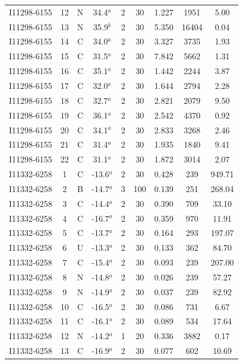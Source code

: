 \begin{table}
\begin{tabular}{ccccccccc}
I11298-6155 & 12 & N & 34.4$^{a}$ & 2 & 30 & 1.227 & 1951 & 5.00 \\
I11298-6155 & 13 & N & 35.9$^{b}$ & 2 & 30 & 5.350 & 16404 & 0.04 \\
I11298-6155 & 14 & C & 34.0$^{a}$ & 2 & 30 & 3.327 & 3735 & 1.93 \\
I11298-6155 & 15 & C & 31.5$^{a}$ & 2 & 30 & 7.842 & 5662 & 1.31 \\
I11298-6155 & 16 & C & 35.1$^{a}$ & 2 & 30 & 1.442 & 2244 & 3.87 \\
I11298-6155 & 17 & C & 32.0$^{a}$ & 2 & 30 & 1.644 & 2794 & 2.28 \\
I11298-6155 & 18 & C & 32.7$^{a}$ & 2 & 30 & 2.821 & 2079 & 9.50 \\
I11298-6155 & 19 & C & 36.1$^{a}$ & 2 & 30 & 2.542 & 4370 & 0.92 \\
I11298-6155 & 20 & C & 34.1$^{a}$ & 2 & 30 & 2.833 & 3268 & 2.46 \\
I11298-6155 & 21 & C & 31.4$^{a}$ & 2 & 30 & 1.935 & 1840 & 9.41 \\
I11298-6155 & 22 & C & 31.1$^{a}$ & 2 & 30 & 1.872 & 3014 & 2.07 \\
I11332-6258 & 1 & C & -13.6$^{a}$ & 2 & 30 & 0.428 & 239 & 949.71 \\
I11332-6258 & 2 & B & -14.7$^{a}$ & 3 & 100 & 0.139 & 251 & 268.04 \\
I11332-6258 & 3 & C & -14.4$^{a}$ & 2 & 30 & 0.390 & 709 & 33.10 \\
I11332-6258 & 4 & C & -16.7$^{a}$ & 2 & 30 & 0.359 & 970 & 11.91 \\
I11332-6258 & 5 & C & -13.7$^{a}$ & 2 & 30 & 0.164 & 293 & 197.07 \\
I11332-6258 & 6 & U & -13.3$^{a}$ & 2 & 30 & 0.133 & 362 & 84.70 \\
I11332-6258 & 7 & C & -15.4$^{a}$ & 2 & 30 & 0.093 & 239 & 207.00 \\
I11332-6258 & 8 & N & -14.8$^{a}$ & 2 & 30 & 0.026 & 239 & 57.27 \\
I11332-6258 & 9 & N & -14.9$^{a}$ & 2 & 30 & 0.037 & 239 & 82.92 \\
I11332-6258 & 10 & C & -16.5$^{a}$ & 2 & 30 & 0.086 & 731 & 6.67 \\
I11332-6258 & 11 & C & -16.1$^{a}$ & 2 & 30 & 0.089 & 534 & 17.64 \\
I11332-6258 & 12 & N & -14.2$^{a}$ & 1 & 20 & 0.336 & 3882 & 0.17 \\
I11332-6258 & 13 & C & -16.9$^{a}$ & 2 & 30 & 0.077 & 602 & 10.69 \\

\end{tabular}
\end{table}
